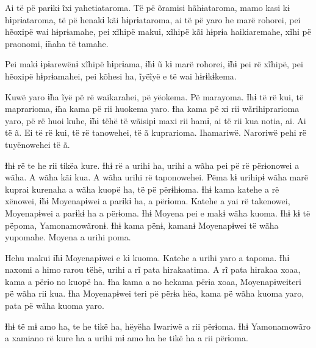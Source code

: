 Ai të pë parɨkɨ ĩxi yahetiataroma. Të pë õramisi hãhɨataroma, mamo kasi
kɨ hɨprɨataroma, të pë henakɨ kãi hɨprɨataroma, ai të pë yaro he marë
rohorei, pei hẽoxipë wai hɨprɨamahe, pei xĩhipë makui, xĩhipë kãi hɨprɨa
haikiaremahe, xĩhi pë praonomi, ɨ̃naha të tamahe. 

Pei makɨ ɨpɨarewënɨ xĩhipë hɨprɨama, ɨ̃hɨ ũ kɨ marë rohorei, ɨ̃hɨ pei rë
xĩhipë, pei hẽoxipë hɨprɨamahei, pei kõhesi ha, ĩyëĩyë e të wai
hɨrɨkɨkema. 

Kuwë yaro ɨ̃ha ĩyë pë rë waikarahei, pë yëokema. Pë marayoma. Ɨhɨ të rë
kui, të maprarioma, ɨ̃ha kama pë rii huokema yaro. Ɨha kama pë xi rii
wãrihiprarioma yaro, pë rë huoi kuhe, ɨ̃hɨ tëhë të wãisipɨ maxi rii hamɨ,
ai të rii kua notia, ai. Ai të ã. Ei të rë kui, të rë tanowehei, të ã
kuprarioma. Ihamariwë. Naroriwë pehi rë tuyënowehei të ã. 

Ɨhɨ rë te he rii tikëa kure. Ɨhɨ rë a urihi ha, urihi a wãha pei pë rë
përɨonowei a wãha. A wãha kãi kua. A wãha urihi rë taponowehei. Pëma kɨ
urihipɨ wãha marë kuprai kurenaha a wãha kuopë ha, të pë përɨhɨoma. Ɨhɨ
kama katehe a rë xënowei, ɨ̃hɨ Moyenapɨwei a parɨkɨ ha, a përɨoma. Katehe
a yai rë takenowei, Moyenapɨwei a parɨkɨ ha a përɨoma. Ɨhɨ Moyena pei e
makɨ wãha kuoma. Ɨhɨ kɨ të pëpoma, Yamonamowãronɨ. Ɨhɨ kama pënɨ, kamanɨ
Moyenapɨwei të wãha yupomahe. Moyena a urihi poma. 

Hehu makui ɨ̃hɨ Moyenapɨwei e kɨ kuoma. Katehe a urihi yaro a tapoma. Ɨhɨ
naxomi a himo rarou tëhë, urihi a rĩ pata hirakaatima. A rĩ pata hirakaa
xoaa, kama a përɨo no kuopë ha. Ɨha kama a no hekama përɨa xoaa,
Moyenapɨweiteri pë wãha rii kua. Ɨha Moyenapɨwei teri pë përɨa hëa, kama
pë wãha kuoma yaro, pata pë wãha kuoma yaro. 

Ɨhɨ të mɨ amo ha, te he tikë ha, hëyëha Iwariwë a rii përɨoma. Ɨhɨ
Yamonamowãro a xamiano rë kure ha a urihi mɨ amo ha he tikë ha a rii
përɨoma. 

 

 
